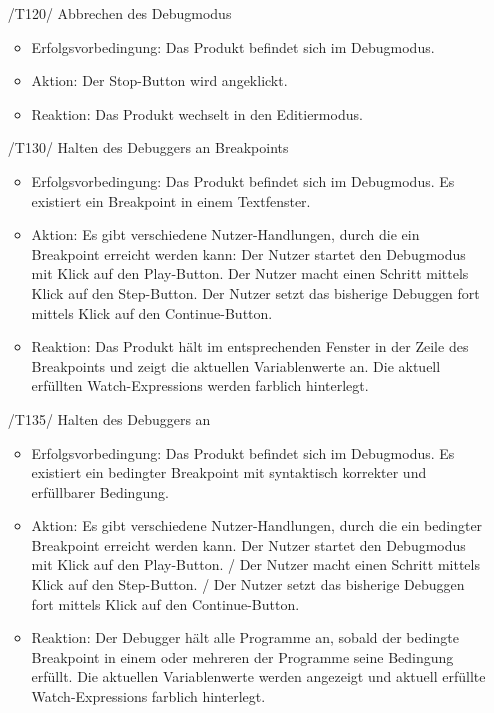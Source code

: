 \documentclass[parskip=full]{scrartcl}
\let\glsplgen\glsuseri
\begin{document}
\begin{itemize}
	\item[/T120/] Abbrechen des Debugmodus
		\begin{itemize}
		\item Erfolgsvorbedingung: Das Produkt befindet sich im Debugmodus.
		\item Aktion: Der Stop-Button wird angeklickt.
		\item Reaktion: Das Produkt wechselt in den Editiermodus.		
		\end{itemize}		
	
	\item[/T130/] Halten des Debuggers an Breakpoints
		\begin{itemize}
		\item Erfolgsvorbedingung: Das Produkt befindet sich im Debugmodus. Es existiert ein Breakpoint in einem Textfenster.
		\item Aktion: Es gibt verschiedene Nutzer-Handlungen, durch die ein Breakpoint erreicht werden kann: Der Nutzer startet den Debugmodus mit Klick auf den Play-Button. Der Nutzer macht einen Schritt mittels Klick auf den Step-Button. Der Nutzer setzt das bisherige Debuggen fort mittels Klick auf den Continue-Button.
		\item Reaktion:	Das Produkt hält im entsprechenden Fenster in der Zeile des \glspl{Breakpoint} und zeigt die aktuellen Variablenwerte an. Die aktuell erfüllten Watch-Expressions werden farblich hinterlegt.
		\end{itemize}		
	
	\item[/T135/] Halten des Debuggers an \glsplgen{bedingter Breakpoint}
		\begin{itemize}
		\item Erfolgsvorbedingung: Das Produkt befindet sich im \gls{Debugmodus}. Es existiert ein bedingter Breakpoint mit syntaktisch korrekter und erfüllbarer Bedingung. 
		\item Aktion: Es gibt verschiedene Nutzer-Handlungen, durch die ein bedingter Breakpoint erreicht werden kann. Der Nutzer startet den Debugmodus mit Klick auf den Play-Button. / Der Nutzer macht einen Schritt mittels Klick auf den Step-Button. / Der Nutzer setzt das bisherige Debuggen fort mittels Klick auf den Continue-Button.
		\item Reaktion:	Der Debugger hält alle Programme an, sobald der bedingte Breakpoint in einem oder mehreren der Programme seine Bedingung erfüllt. Die aktuellen Variablenwerte werden angezeigt und aktuell erfüllte Watch-Expressions farblich hinterlegt.
		\end{itemize}	
	

\end{itemize}
\end{document}
